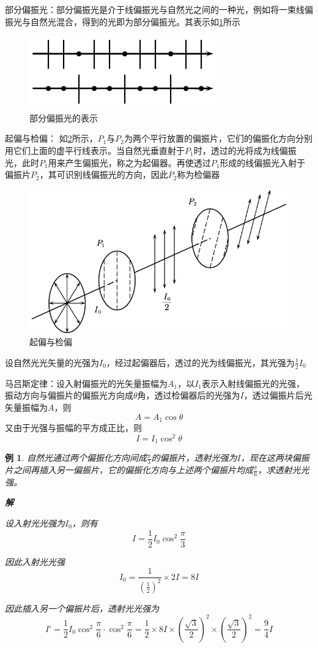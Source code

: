 \documentclass[12pt, a4paper, twoside]{ctexbook}
\newtheorem{example}[theorem]{例}
\begin{document}
{\sonti 部分偏振光}：部分偏振光是介于线偏振光与自然光之间的一种光，例如将一束线偏振光与自然光混合，得到的光即为部分偏振光。其表示如\textcolor{blue}{\cref{fig:部分偏振光}}所示
\begin{figure}[H]
    \centerline{\includegraphics[scale=1.2]{部分偏振光}}
    \caption{部分偏振光的表示}
    \label{fig:部分偏振光}
\end{figure}
{\sonti 起偏与检偏}：
如\textcolor{blue}{\cref{fig:起偏与检偏}}所示，$P_1$与$P_2$为两个平行放置的偏振片，它们的偏振化方向分别用它们上面的虚平行线表示。当自然光垂直射于$P_1$时，透过的光将成为线偏振光，此时$P_1$用来产生偏振光，称之为起偏器。再使透过$P_1$形成的线偏振光入射于偏振片$P_2$，其可识别线偏振光的方向，因此$P_2$称为检偏器
\begin{figure}[H]
    \centerline{\includegraphics[scale=1.0]{起偏与检偏}}
    \caption{起偏与检偏}
    \label{fig:起偏与检偏}
\end{figure}

设自然光光矢量的光强为$I_0$，经过起偏器后，透过的光为线偏振光，其光强为$\frac{1}{2}I_0$

{\sonti 马吕斯定律}：设入射偏振光的光矢量振幅为$A_1$，以$I_1$表示入射线偏振光的光强，振动方向与偏振片的偏振光方向成$\theta$角，透过检偏器后的光强为$I$，透过偏振片后光矢量振幅为$A$，则
$$
A=A_1\cos\theta
$$
又由于光强与振幅的平方成正比，则
$$
I=I_1\cos^2\theta
$$
\begin{example}
    自然光通过两个偏振化方向间成$\frac{\pi}{3}$的偏振片，透射光强为$I$，现在这两块偏振片之间再插入另一偏振片，它的偏振化方向与上述两个偏振片均成$\frac{\pi}{6}$，求透射光光强。

    \noindent\textbf{解}

    设入射光光强为$I_0$，则有
    $$
    I=\frac{1}{2}I_0\cos^2\frac{\pi}{3}
    $$

    因此入射光光强
    $$
    I_0=\frac{1}{\left(\frac{1}{2}\right)^2}\times2I=8I
    $$

    因此插入另一个偏振片后，透射光光强为
    $$
    I'=\frac{1}{2}I_0 \cos^2\frac{\pi}{6}\cdot\cos^2\frac{\pi}{6}=\frac{1}{2}\times8I\times\left(\frac{\sqrt{3}}{2}\right)^2\times\left(\frac{\sqrt{3}}{2}\right)^2=\frac{9}{4}I
    $$
\end{example}
\end{document}
